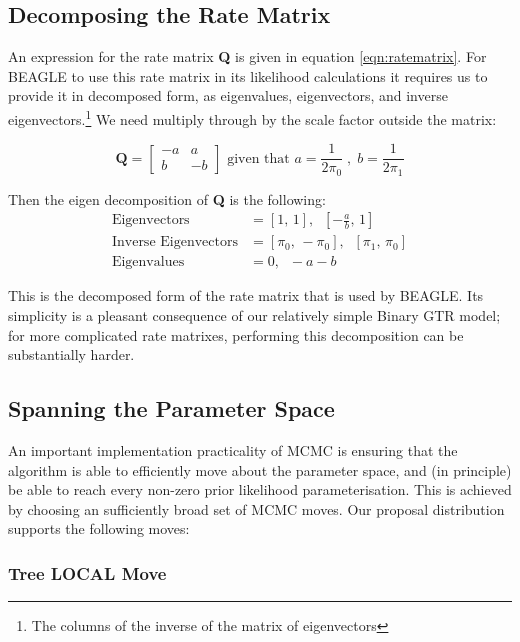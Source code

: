 \documentclass[10pt,journal,compsoc]{IEEEtran}
\begin{document}
\subsection{Decomposing the Rate Matrix}

An expression for the rate matrix \textbf{Q} is given in equation \eqref{eqn:ratematrix}. For BEAGLE to use this rate matrix in its likelihood calculations it requires us to provide it in decomposed form, as eigenvalues, eigenvectors, and inverse eigenvectors.\footnote{The columns of the inverse of the matrix of eigenvectors} We need multiply through by the scale factor outside the matrix:

\begin{equation}
    \textbf{Q} = \begin{bmatrix}
-a & a\\
b & -b
\end{bmatrix} \text{ \ given that \ } a = \frac{1}{2 \pi_0} \;,\; b = \frac{1}{2 \pi_1}
\end{equation}

\noindent Then the eigen decomposition of \textbf{Q} is the following:
\begin{align*}
    \text{Eigenvectors} &= [1,\, 1],\;\;  [-\frac{a}{b},\, 1] \\
    \text{Inverse Eigenvectors} &= [\pi_0,\, -\pi_0],\;\;  [\pi_1,\, \pi_0]\\
    \text{Eigenvalues} &= 0,\;\; -a-b
\end{align*}

This is the decomposed form of the rate matrix that is used by BEAGLE. Its simplicity is a pleasant consequence of our relatively simple Binary GTR model; for more complicated rate matrixes, performing this decomposition can be substantially harder.

\subsection{Spanning the Parameter Space}

An important implementation practicality of MCMC is ensuring that the algorithm is able to efficiently move about the parameter space, and (in principle) be able to reach every non-zero prior likelihood parameterisation. This is achieved by choosing an sufficiently broad set of MCMC moves. Our proposal distribution supports the following moves:

\subsubsection{Tree LOCAL Move}
\end{document}

